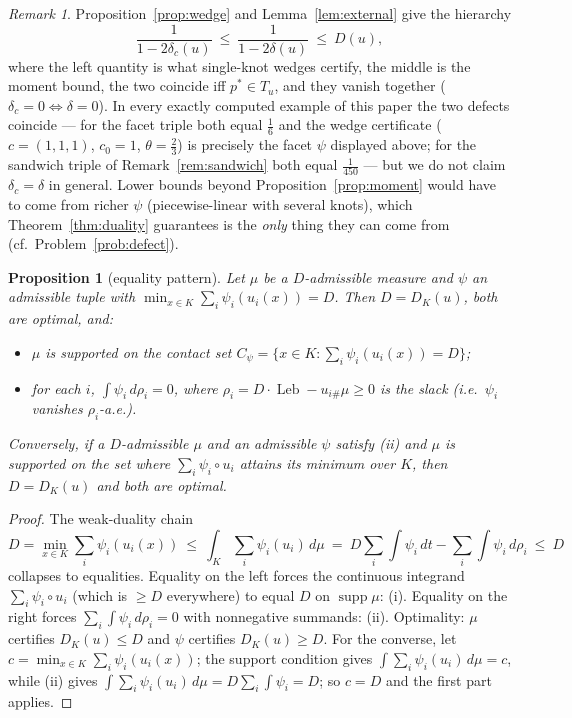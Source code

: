 \documentclass[11pt,reqno]{amsart}
\theoremstyle{plain}
\newtheorem{proposition}[theorem]{Proposition}
\theoremstyle{definition}
\theoremstyle{remark}
\newtheorem{remark}[theorem]{Remark}
\newcommand{\Leb}{\operatorname{Leb}}
\begin{document}
\begin{remark}\label{rem:wedgemoment}
Proposition~\ref{prop:wedge} and Lemma~\ref{lem:external} give the hierarchy
\[
\frac1{1-2\delta_c(u)}\ \le\ \frac1{1-2\delta(u)}\ \le\ D(u),
\]
where the left quantity is what single-knot wedges certify, the middle is the
moment bound, the two coincide iff $p^\ast\in T_u$, and they vanish
together ($\delta_c=0\iff\delta=0$). In every exactly computed example of
this paper the two defects coincide --- for the facet triple both equal
$\tfrac16$ and the wedge certificate ($c=(1,1,1)$, $c_0=1$,
$\theta=\tfrac23$) is precisely the facet $\psi$ displayed above; for the
sandwich triple of Remark~\ref{rem:sandwich} both equal $\tfrac1{450}$ ---
but we do not claim $\delta_c=\delta$ in general. Lower bounds beyond
Proposition~\ref{prop:moment} would have to come from richer $\psi$
(piecewise-linear with several knots), which Theorem~\ref{thm:duality}
guarantees is the \emph{only} thing they can come from
(cf.\ Problem~\ref{prob:defect}).
\end{remark}

\begin{proposition}[equality pattern]\label{prop:slack}
Let $\mu$ be a $D$-admissible measure and $\psi$ an admissible tuple with
$\min_{x\in K}\sum_i\psi_i(u_i(x))=D$. Then $D=D_K(u)$, both are optimal,
and:
\begin{itemize}
\item[(i)] $\mu$ is supported on the \emph{contact set}
$C_\psi=\bigl\{x\in K:\sum_i\psi_i(u_i(x))=D\bigr\}$;
\item[(ii)] for each $i$, $\int\psi_i\,d\rho_i=0$, where
$\rho_i=D\cdot\Leb-u_{i\#}\mu\ge0$ is the slack (i.e.\ $\psi_i$ vanishes
$\rho_i$-a.e.).
\end{itemize}
Conversely, if a $D$-admissible $\mu$ and an admissible
$\psi$ satisfy (ii) and $\mu$ is supported on the set where
$\sum_i\psi_i\circ u_i$ attains its minimum over $K$, then
$D=D_K(u)$ and both are optimal.
\end{proposition}

\begin{proof}
The weak-duality chain
\[
D=\min_{x\in K}\sum_i\psi_i(u_i(x))\ \le\ \int_K\sum_i\psi_i(u_i)\,d\mu
\ =\ D\sum_i\int\psi_i\,dt-\sum_i\int\psi_i\,d\rho_i\ \le\ D
\]
collapses to equalities. Equality on the left forces the continuous integrand
$\sum_i\psi_i\circ u_i$ (which is $\ge D$ everywhere) to equal $D$ on
$\operatorname{supp}\mu$: (i). Equality on the right forces
$\sum_i\int\psi_i\,d\rho_i=0$ with nonnegative summands: (ii). Optimality:
$\mu$ certifies $D_K(u)\le D$ and $\psi$ certifies $D_K(u)\ge D$. For the
converse, let $c=\min_{x\in K}\sum_i\psi_i(u_i(x))$; the support condition
gives $\int\sum_i\psi_i(u_i)\,d\mu=c$, while (ii) gives
$\int\sum_i\psi_i(u_i)\,d\mu=D\sum_i\int\psi_i=D$; so $c=D$ and the first
part applies.
\end{proof}
\end{document}
